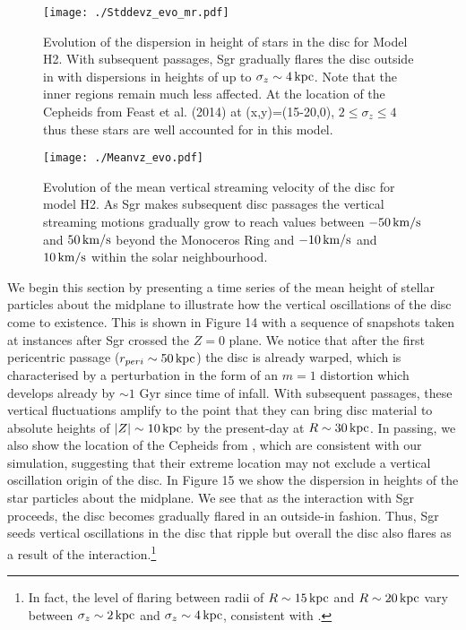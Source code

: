 \documentclass[useAMS,usenatbib]{mnras}
\begin{document}
\begin{figure}
\texttt{[image: ./Stddevz\_evo\_mr.pdf]}
\caption[]{Evolution of the dispersion in height of stars in the disc for Model H2. With subsequent passages, Sgr gradually flares the disc outside in with dispersions in heights of up to $\sigma_{z}\sim4\,\rm{kpc}$. Note that the inner regions remain much less affected. At the location of the Cepheids from Feast et al. (2014) at (x,y)=(15-20,0), $2\leq\sigma_{z}\leq4$ thus these stars are well accounted for in this model.}
\end{figure}



\begin{figure}
\texttt{[image: ./Meanvz\_evo.pdf]}
\caption[]{Evolution of the mean vertical streaming velocity of the disc for model H2. As Sgr makes subsequent disc passages the vertical streaming motions gradually grow to reach values between $-50\,\rm{km/s}$ and $50\,\rm{km/s}$ beyond the Monoceros Ring and $-10\,\rm{km/s}$ and $10\,\rm{km/s}$ within the solar neighbourhood.}
\end{figure}

We begin this section by presenting a time series of the mean height of stellar particles about the midplane to illustrate how the vertical oscillations of the disc come to existence. This is shown in Figure 14 with a sequence of snapshots taken at instances after Sgr crossed the $Z=0$ plane. We notice that after the first pericentric passage ($r_{peri}\sim50\,\rm{kpc}$) the disc is already warped, which is characterised by a perturbation in the form of an $m=1$ distortion which develops already by $\sim1$ Gyr since time of infall. With subsequent passages, these vertical fluctuations amplify to the point that they can bring disc material to absolute heights of $|Z|\sim10 \,\rm{kpc}$ by the present-day at $R\sim30\,\rm{kpc}$. In passing, we also show the location of the Cepheids from \cite{feast14}, which are consistent with our simulation, suggesting that their extreme location may not exclude a vertical oscillation origin of the disc. In Figure 15 we show the dispersion in heights of the star particles about the midplane. We see that as the interaction with Sgr proceeds, the disc becomes gradually flared in an outside-in fashion. Thus, Sgr seeds vertical oscillations in the disc that ripple but overall the disc also flares as a result of the interaction.\footnote{In fact, the level of flaring between radii of $R\sim15\,\rm{kpc}$ and $R\sim20\,\rm{kpc}$ vary between $\sigma_{z}\sim2\,\rm{kpc}$ and $\sigma_{z}\sim4\,\rm{kpc}$, consistent with \cite{feast14}.}
\end{document}
